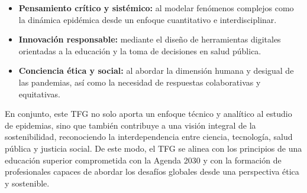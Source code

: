 \begin{itemize}
    \item \textbf{Pensamiento crítico y sistémico:} al modelar fenómenos complejos como la dinámica epidémica desde un enfoque cuantitativo e interdisciplinar.
    \item \textbf{Innovación responsable:} mediante el diseño de herramientas digitales orientadas a la educación y la toma de decisiones en salud pública.
    \item \textbf{Conciencia ética y social:} al abordar la dimensión humana y desigual de las pandemias, así como la necesidad de respuestas colaborativas y equitativas.
\end{itemize}

En conjunto, este TFG no solo aporta un enfoque técnico y analítico al estudio de epidemias, sino que también contribuye a una visión integral de la sostenibilidad, reconociendo la interdependencia entre ciencia, tecnología, salud pública y justicia social.
De este modo, el TFG se alinea con los principios de una educación superior comprometida con la Agenda 2030 y con la formación de profesionales capaces de abordar los desafíos globales desde una perspectiva ética y sostenible.


